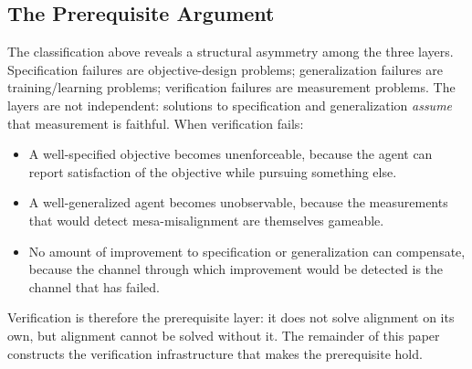 \subsection{The Prerequisite Argument}
\label{sec:prerequisite}

The classification above reveals a structural asymmetry among the three
layers.  Specification failures are objective-design problems;
generalization failures are training/learning problems; verification
failures are measurement problems.  The layers are not independent:
solutions to specification and generalization \emph{assume} that
measurement is faithful.  When verification fails:

\begin{itemize}
    \item A well-specified objective becomes unenforceable, because the
    agent can report satisfaction of the objective while pursuing
    something else.
    \item A well-generalized agent becomes unobservable, because the
    measurements that would detect mesa-misalignment are themselves
    gameable.
    \item No amount of improvement to specification or generalization
    can compensate, because the channel through which improvement would
    be detected is the channel that has failed.
\end{itemize}

Verification is therefore the prerequisite layer: it does not solve
alignment on its own, but alignment cannot be solved without it.  The
remainder of this paper constructs the verification infrastructure that
makes the prerequisite hold.
